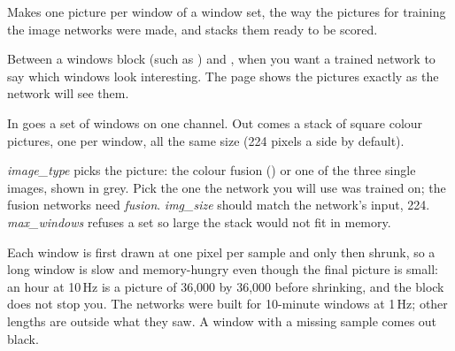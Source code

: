 Makes one picture per window of a window set, the way the pictures for training the image
networks were made, and stacks them ready to be scored.

Between a windows block (such as ) and
, when you want a trained network to say which windows look
interesting. The page shows the pictures exactly as the network will see them.

In goes a set of windows on one channel. Out comes a stack of square colour pictures, one per
window, all the same size (224 pixels a side by default).

\emph{image\_type} picks the picture: the colour fusion ()
or one of the three single images, shown in grey. Pick the one the network you will use was
trained on; the fusion networks need \emph{fusion}. \emph{img\_size} should match the
network's input, 224. \emph{max\_windows} refuses a set so large the stack would not fit in
memory.

Each window is first drawn at one pixel per sample and only then shrunk, so a long window is
slow and memory-hungry even though the final picture is small: an hour at 10\,Hz is a
picture of 36{,}000 by 36{,}000 before shrinking, and the block does not stop you. The
networks were built for 10-minute windows at 1\,Hz; other lengths are outside what they
saw. A window with a missing sample comes out black.
